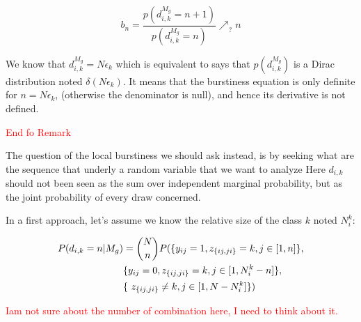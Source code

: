 \begin{equation}
b_n = \frac{p(d_{i,k}^{M_g} = n+1)}{p(d_{i,k}^{M_g} = n)}  \nearrow_? n 
\end{equation}

We know that $d_{i,k}^{M_g} = N \epsilon_k$ which is equivalent to says that $p(d_{i,k}^{M_g})$ is a Dirac distribution noted $\delta (N\epsilon_k)$. It means that the burstiness equation is only definite for $n = N\epsilon_k$, (otherwise the denominator is null), and hence its derivative is not defined.


\textcolor{red}{End fo Remark
\hrulefill
\hrulefill
~\\
}

The question of the local burstiness we should ask instead, is by seeking what are the sequence that underly a random variable that we want to analyze Here $d_{i,k}$ should not been seen as the sum over independent marginal probability, but as the joint probability of every draw concerned. 

In a first approach, let's assume we know the relative size of the class $k$ noted $N_i^k$:

\begin{align*}
P(d_{i,k}=n | M_g) &= \dbinom{N}{n} P(\{y_{ij}=1, z_{\{ij,ji\}}=k, j\in [1,n]\}, \\ & \{y_{ij}=0, z_{\{ij,ji\}}=k, j\in [1,N_i^k-n]\}, \\
&  \{\ z_{\{ij,ji\}}\neq k, j\in [1,N-N_i^k]\}) \\
\end{align*}


\textcolor{red}{Iam not sure about the number of combination here, I need to think about it.}
